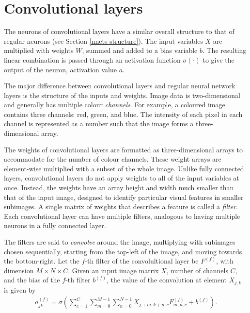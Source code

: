 \section{Convolutional layers}\label{convnets-convlayer}

The neurons of convolutional layers have a similar overall structure to that of regular neurons (see Section \ref{nnets-structure}). The input variables $X$ are multiplied with weights $W$, summed and added to a bias variable $b$. The resulting linear combination is passed through an activation function $\sigma(\cdot)$ to give the output of the neuron, activation value $a$.

The major difference between convolutional layers and regular neural network layers is the structure of the inputs and weights. Image data is two-dimensional and generally has multiple colour \textit{channels}. For example, a coloured image contains three channels: red, green, and blue. The intensity of each pixel in each channel is represented as a number such that the image forms a three-dimensional array. 

The weights of convolutional layers are formatted as three-dimensional arrays to accommodate for the number of colour channels. These weight arrays are element-wise multiplied with a subset of the whole image. Unlike fully connected layers, convolutional layers do not apply weights to all of the input variables at once. Instead, the weights have an array height and width much smaller than that of the input image, designed to identify particular visual features in smaller subimages. A single matrix of weights that describes a feature is called a \textit{filter}. Each convolutional layer can have multiple filters, analogous to having multiple neurons in a fully connected layer.

The filters are said to \textit{convolve} around the image, multiplying with subimages chosen sequentially, starting from the top-left of the image, and moving towards the bottom-right. Let the $f$-th filter of the convolultional layer be $F^{(f)}$, with dimension $M\times N \times C$. Given an input image matrix $X$, number of channels $C$, and the bias of the $f$-th filter $b^{(f)}$, the value of the convolution at element $X_{j,k}$ is given by
\begin{align}
	a_{jk}^{(f)} = \sigma\left(\sum_{c=1}^C\sum_{m=0}^{M-1}\sum_{n=0}^{N-1}X_{j+m, k+n, c}F_{m,n,c}^{(f)}  + b^{(f)}\right).
\end{align}


